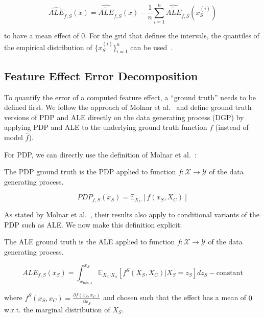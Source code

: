 \documentclass[runningheads]{llncs}
\begin{document}
\begin{equation}\label{eq:ale-estimate-centered}
    \widehat{ALE}_{\hat f, S}(x) =
    \widehat{\widetilde{ALE}}_{\hat f, S}(x)
    - \frac{1}{n} \sum_{i=1}^n \widehat{\widetilde{ALE}}_{\hat f, S}(x_S^{(i)})
\end{equation}

\noindent to have a mean effect of $0$. For the grid that defines the intervals,
the quantiles of the empirical distribution of $\{x^{(i)}_S\}_{i=1}^n$ can be
used~\cite{apley_visualizing_2020}.\\

\subsection{Feature Effect Error Decomposition}

To quantify the error of a computed feature effect, a ``ground truth'' needs to
be defined first. We follow the approach of Molnar et
al.~\cite{molnar_relating_2023} and define ground truth versions of PDP and ALE
directly on the data generating process (DGP) by applying PDP and ALE to the
underlying ground truth function $f$ (instead of model $\hat f$).

For PDP, we can directly use the definition of Molnar et
al.~\cite{molnar_relating_2023}:

\begin{definition}
    The PDP ground truth is the PDP applied to function
    $f : \mathcal{X} \xrightarrow{} \mathcal{Y}$
    of the data generating process.

    \begin{equation}
        PDP_{f,S}(x_S) = \mathbb{E}_{X_C}[f(x_S,X_C)]
    \end{equation}
\end{definition}

As stated by Molnar et al.~\cite{molnar_relating_2023}, their results also
apply to conditional variants of the PDP such as ALE. We now make this
definition explicit:

\begin{definition}
    The ALE ground truth is the ALE applied to function $f : \mathcal{X} \xrightarrow{} \mathcal{Y}$ of the data generating process.

    \begin{equation}
        ALE_{f,S}(x_S) = \int_{x_{\text{min},s}}^{x_S} \mathbb{E}_{X_C|X_S} \left[f^S(X_S, X_C)|X_S = z_S\right] dz_S - \text{constant}
    \end{equation}

    \noindent where $f^S(x_S, x_C) = \frac{\partial f(x_S, x_C)}{\partial x_S}$ and  chosen such that the effect has a mean of $0$ w.r.t. the marginal distribution of $X_S$.
\end{definition}
\end{document}
